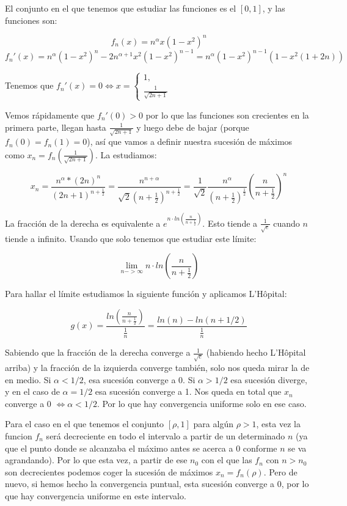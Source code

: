 
El conjunto en el que tenemos que estudiar las funciones es el $[0,1]$, y las funciones son:

$$f_n(x) = n^\alpha x(1-x^2)^n$$ 
$$f_n'(x) = n^\alpha(1-x^2)^n - 2n^{\alpha+1}x^2(1-x^2)^{n-1} = n^\alpha(1-x^2)^{n-1}(1-x^2(1+2n))$$

Tenemos que $f_n'(x) = 0 \iff x=\left\{
\begin{array}{l}
1, \\
\frac{1}{\sqrt{2n+1}}
\end{array}\right.$

Vemos rápidamente que $f_n'(0) > 0$ por lo que las funciones son crecientes en la primera parte, llegan hasta $\frac{1}{\sqrt{2n+1}}$ y luego debe de bajar (porque $f_n(0) = f_n(1) = 0$), así que vamos a definir nuestra sucesión de máximos como $x_n = f_n\left(\frac{1}{\sqrt{2n+1}}\right)$. La estudiamos:

$$x_n = \frac{n^\alpha*(2n)^n}{(2n+1)^{n+\frac{1}{2}}} =  \frac{n^{n+\alpha}}{\sqrt 2(n+\frac{1}{2})^{n+\frac{1}{2}}} = \frac{1}{\sqrt 2}\frac{n^\alpha}{(n+\frac{1}{2})^{\frac{1}{2}}}\left(\frac{n}{n+\frac{1}{2}}\right)^n$$

La fracción de la derecha es equivalente a $e^{n\cdot ln\left(\frac{n}{n+\frac{1}{2}}\right)}$. Esto tiende a $\frac{1}{\sqrt e}$ cuando $n$ tiende a infinito. Usando que solo tenemos que estudiar este límite:

$$\lim\limits_{n->\infty} n\cdot ln\left(\frac{n}{n+\frac{1}{2}}\right)$$

Para hallar el límite estudiamos la siguiente función y aplicamos L'Hôpital:

$$g(x) = \frac{ln\left(\frac{n}{n+{\frac{1}{2}}}\right)}{\frac{1}{n}} = \frac{ln(n)-ln(n+1/2)}{\frac{1}{n}}$$



Sabiendo que la fracción de la derecha converge a $\frac{1}{\sqrt e}$ (habiendo hecho L'Hôpital arriba) y la fracción de la izquierda converge también, solo nos queda mirar la de en medio. Si $\alpha < 1/2$, esa sucesión converge a 0. Si $\alpha > 1/2$ esa sucesión diverge, y en el caso de $\alpha = 1/2$ esa sucesión converge a 1. Nos queda en total que ${x_n}$ converge a 0 $\iff \alpha < 1/2$. Por lo que hay convergencia uniforme solo en ese caso.

Para el caso en el que tenemos el conjunto $[\rho, 1]$ para algún $\rho > 1$, esta vez la funcion $f_n$ será decreciente en todo el intervalo a partir de un determinado $n$ (ya que el punto donde se alcanzaba el máximo antes se acerca a 0 conforme $n$ se va agrandando). Por lo que esta vez, a partir de ese $n_0$ con el que las $f_n$ con $n>n_0$ son decrecientes podemos coger la sucesión de máximos $x_n = f_n(\rho)$. Pero de nuevo, si hemos hecho la convergencia puntual, esta sucesión converge a 0, por lo que hay convergencia uniforme en este intervalo.
